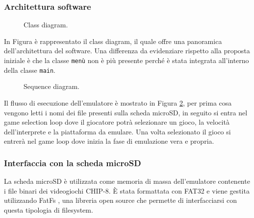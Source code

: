 \documentclass[a4paper]{article}
\begin{document}
\clearpage

\subsubsection{Architettura software}

\begin{figure}[h!t]
    \begin{center}
        \begin{tikzpicture}[scale=0.6, transform shape]
            
        \end{tikzpicture}
    \end{center}
    \caption{
       Class diagram.
    }
    \label{fig:class_diagram}
\end{figure}

In Figura \label{fig:class_diagram} è rappresentato il class diagram, il quale offre una panoramica
dell'architettura del software. Una differenza da evidenziare rispetto alla proposta iniziale
è che la classe \texttt{menù} non è più presente perché è stata integrata all'interno della
classe \texttt{main}.

\begin{figure}[h!t]
    \begin{center}
        
    \end{center}
    \caption{
        Sequence diagram.
    }
    \label{fig:sequence_diagram}
\end{figure}

Il flusso di esecuzione dell'emulatore è mostrato in Figura \ref{fig:sequence_diagram},
per prima cosa vengono letti i nomi dei file presenti sulla scheda microSD, in seguito
si entra nel game selection loop dove il giocatore potrà selezionare un gioco, la velocità
dell'interprete e la piattaforma da emulare. Una volta selezionato il gioco si entrerà nel
game loop dove inizia la fase di emulazione vera e propria.

\subsubsection{Interfaccia con la scheda microSD}\label{subsubsec:sd}

La scheda microSD è utilizzata come memoria di massa dell'emulatore contenente i file
binari dei videogiochi CHIP-8. È stata formattata con FAT32 e viene gestita utilizzando
FatFs \cite{elm-chan:fatfs}, una libreria open source che permette di interfacciarsi
con questa tipologia di filesystem.
\end{document}
